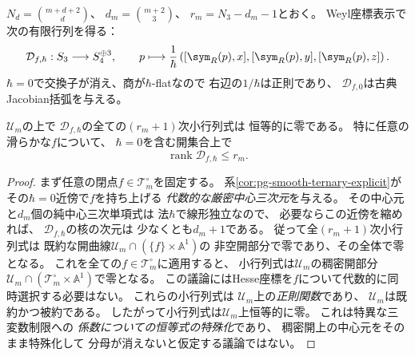 $N_d=\binom{m+d+2}{d}$、
$d_m=\binom{m+2}{3}$、
$r_m=N_3-d_m-1$とおく。
Weyl座標表示で次の有限行列を得る：
\begin{equation}
 \mathcal D_{f,\hbar}:S_3\longrightarrow S_4^{\oplus3},
 \qquad
 p\longmapsto
 \frac1\hbar\left(
 [\sym_R(p),x],[\sym_R(p),y],[\sym_R(p),z]\right).
 \label{eq:pg-det-commutator-matrix}
\end{equation}
$\hbar=0$で交換子が消え、商が$\hbar$-flatなので
右辺の$1/\hbar$は正則であり、
$\mathcal D_{f,0}$は古典Jacobian括弧を与える。

\begin{lemma}[量子交換子行列の普遍階数恒等式]
\label{lem:pg-det-universal-rank}
$\mathcal U_m$の上で
$\mathcal D_{f,\hbar}$の全ての$(r_m+1)$次小行列式は
恒等的に零である。
特に任意の滑らかな$f$について、
$\hbar=0$を含む開集合上で
\begin{equation}
 \operatorname{rank}\mathcal D_{f,\hbar}\le r_m.
 \label{eq:pg-det-universal-rank}
\end{equation}
\end{lemma}
\begin{proof}
まず任意の閉点$f\in\mathcal T_m^\circ$を固定する。
系\ref{cor:pg-smooth-ternary-explicit}が
その$\hbar=0$近傍で$f$を持ち上げる
\emph{代数的な厳密中心三次元}を与える。
その中心元と$d_m$個の純中心三次単項式は
法$\hbar$で線形独立なので、
必要ならこの近傍を縮めれば、
$\mathcal D_{f,\hbar}$の核の次元は
少なくとも$d_m+1$である。
従って全$(r_m+1)$次小行列式は
既約な開曲線$\mathcal U_m\cap(\{f\}\times\mathbb A^1)$の
非空開部分で零であり、その全体で零となる。
これを全ての$f\in\mathcal T_m^\circ$に適用すると、
小行列式は$\mathcal U_m$の稠密開部分
$\mathcal U_m\cap(\mathcal T_m^\circ\times\mathbb A^1)$で零となる。
この議論にはHesse座標を$f$について代数的に同時選択する必要はない。
これらの小行列式は
$\mathcal U_m$上の\emph{正則関数}であり、
$\mathcal U_m$は既約かつ被約である。
したがって小行列式は$\mathcal U_m$上恒等的に零。
これは特異な三変数制限への
\emph{係数についての恒等式の特殊化}であり、
稠密開上の中心元をそのまま特殊化して
分母が消えないと仮定する議論ではない。
\end{proof}

